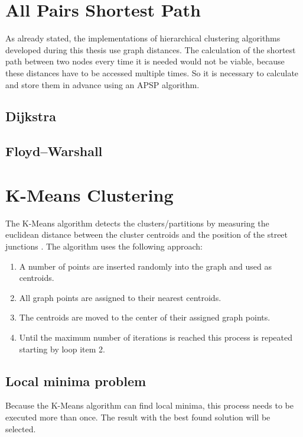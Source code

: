 \section{All Pairs Shortest Path} \label{sec:shortest_path}
As already stated, the implementations of hierarchical clustering algorithms developed during this thesis use graph distances. The calculation of the shortest path between two nodes every time it is needed would not be viable, because these distances have to be accessed multiple times. So it is necessary to calculate and store them in advance using an \gls{APSP} algorithm.

\subsection{Dijkstra}

\subsection{Floyd–Warshall}

\section{K-Means Clustering}
\label{sec:K-Means}
The K-Means algorithm detects the clusters/partitions by measuring the euclidean distance between the cluster centroids and the position of the street junctions \cite{k-means++:2007}. The algorithm uses the following approach:

\begin{enumerate}
    \item A number of points are inserted randomly into the graph and used as centroids.
    \item All graph points are assigned to their nearest centroids.
    \item The centroids are moved to the center of their assigned graph points.
    \item Until the maximum number of iterations is reached this process is repeated starting by loop item 2.
\end{enumerate}

\subsection{Local minima problem}
Because the K-Means algorithm can find local minima, this process needs to be executed more than once. The result with the best found solution will be selected.

